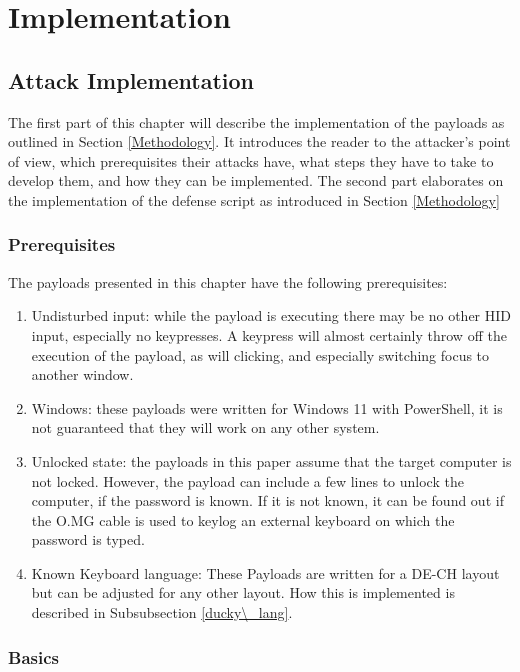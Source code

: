 \chapter{Implementation} \label{Implementation}

\section{Attack Implementation} \label{Attack Implementation}

The first part of this chapter will describe the implementation of the payloads as outlined in Section \ref{Methodology}. It introduces the reader to the attacker's point of view, which prerequisites their attacks have, what steps they have to take to develop them, and how they can be implemented. The second part elaborates on the implementation of the defense script as introduced in Section \ref{Methodology}


\subsection{Prerequisites}

The payloads presented in this chapter have the following prerequisites:
\begin{enumerate}
    \item Undisturbed input: while the payload is executing there may be no other HID input, especially no keypresses. A keypress will almost certainly throw off the execution of the payload, as will clicking, and especially switching focus to another window.
    \item Windows: these payloads were written for Windows 11 with PowerShell, it is not guaranteed that they will work on any other system.
    \item Unlocked state: the payloads in this paper assume that the target computer is not locked. However, the payload can include a few lines to unlock the computer, if the password is known. If it is not known, it can be found out if the O.MG cable is used to keylog an external keyboard on which the password is typed. 
    \item Known Keyboard language: These Payloads are written for a DE-CH layout but can be adjusted for any other layout. How this is implemented is described in Subsubsection \ref{ducky\_lang}. 
\end{enumerate}

\subsection{Basics}

